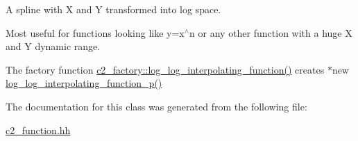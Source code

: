 A spline with X and Y transformed into log space.

Most useful for functions looking like y=x$^\wedge$n or any other function with a huge X and Y dynamic range. 

The factory function \hyperlink{classc2__factory_a18b0897567e472e50290fcb1834176d3}{c2\-\_\-factory\-::log\-\_\-log\-\_\-interpolating\-\_\-function()} creates $\ast$new \hyperlink{classlog__log__interpolating__function__p_a7da92b61c290a647a51c027d06463b4e}{log\-\_\-log\-\_\-interpolating\-\_\-function\-\_\-p()} 

The documentation for this class was generated from the following file\-:\begin{DoxyCompactItemize}
\item 
\hyperlink{c2__function_8hh}{c2\-\_\-function.\-hh}\end{DoxyCompactItemize}
